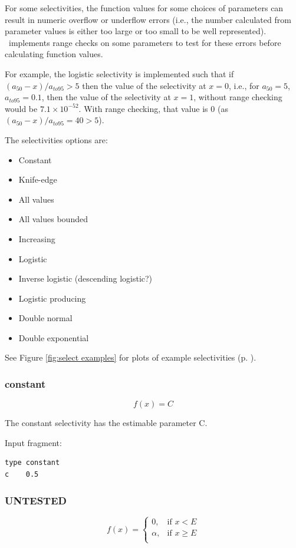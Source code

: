 For some selectivities, the function values for some choices of parameters can result in numeric overflow or underflow errors (i.e., the number calculated from parameter values is either too large or too small to be well represented). \CNAME~implements range checks on some parameters to test for these errors before calculating function values.

For example, the logistic selectivity is implemented such that if $(a_{50}-x)/a_{to95} > 5$ then the value of the selectivity at $x=0$, i.e., for $a_{50}=5$, $a_{to95}=0.1$, then the value of the selectivity at $x=1$, without range checking would be $7.1 \times 10^{-52}$. With range checking, that value is $0$ (as $(a_{50}-x)/a_{to95}=40 > 5$).

The selectivities options are:

\begin{itemize}
  \item Constant
  \item Knife-edge
  \item All values
  \item All values bounded
  \item Increasing
  \item Logistic
  \item Inverse logistic (descending logistic?)
  \item Logistic producing
  \item Double normal
  \item Double exponential
\end{itemize}

See Figure \ref{fig:select examples} for plots of example selectivities (p. \pageref{fig:select examples}).

\subsubsection[Constant]{{constant}}

\begin{equation}
f(x)=C
\end{equation}

The constant selectivity has the estimable parameter C.

Input fragment: {\small{\begin{verbatim}
type constant
c    0.5
\end{verbatim}}}

\subsubsection[Knife-edge]{  UNTESTED}
\begin{equation}
f(x)= \begin{cases}
  0, & \text{if $x < E$} \\
  \alpha, & \text{if $x \ge E$}\\
  \end{cases}
\end{equation}

